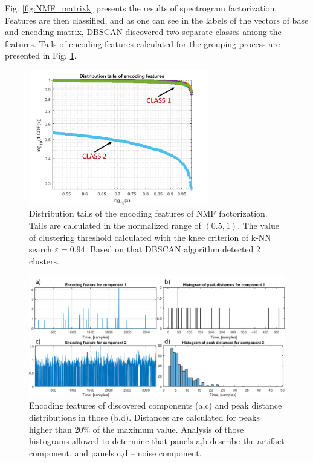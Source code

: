 \documentclass[3p,times]{elsarticle}
\begin{document}
Fig. \ref{fig:NMF_matrixk} presents the results of spectrogram factorization. Features are then classified, and as one can see in the labels of the vectors of base and encoding matrix, DBSCAN discovered two separate classes among the features. Tails of encoding features calculated for the grouping process are presented in Fig. \ref{fig:NMF_tailsk}.

\begin{figure}[ht!]
\centering
\includegraphics[width=0.7\textwidth]{figs/tailsk.png}
\caption{Distribution tails of the encoding features of NMF factorization. Tails are calculated in the normalized range of $(0.5,1)$. The value of clustering threshold calculated with the knee criterion of k-NN search $\varepsilon=0.94$. Based on that DBSCAN algorithm detected 2 clusters.}
\label{fig:NMF_tailsk}
\end{figure}

\begin{figure}[ht!]
\centering
\includegraphics[width=\textwidth]{figs/histk.png}
\caption{Encoding features of discovered components (a,c) and peak distance distributions in those (b,d). Distances are calculated for peaks higher than 20\% of the maximum value. Analysis of those histograms allowed to determine that panels a,b describe the artifact component, and panels c,d -- noise component.}
\label{fig:NMF_histk}
\end{figure}
\end{document}
